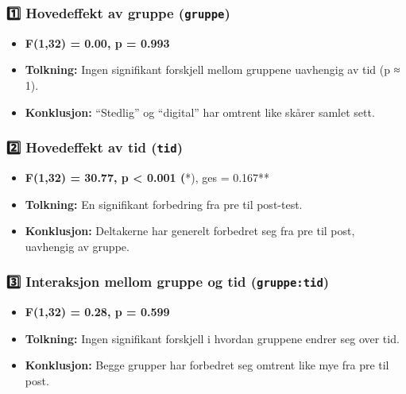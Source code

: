 \documentclass[
  letterpaper,
  DIV=11,
  numbers=noendperiod]{scrreprt}
\providecommand{\tightlist}{%
  \setlength{\itemsep}{0pt}\setlength{\parskip}{0pt}}\usepackage{longtable,booktabs,array}
\begin{document}
\hypertarget{hovedeffekt-av-gruppe-gruppe}{%
\subsubsection{\texorpdfstring{1️⃣ \textbf{Hovedeffekt av gruppe
(\texttt{gruppe})}}{1️⃣ Hovedeffekt av gruppe (gruppe)}}\label{hovedeffekt-av-gruppe-gruppe}}

\begin{itemize}
\tightlist
\item
  \textbf{F(1,32) = 0.00, p = 0.993}\\
\item
  \textbf{Tolkning:} Ingen signifikant forskjell mellom gruppene
  uavhengig av tid (p ≈ 1).\\
\item
  \textbf{Konklusjon:} ``Stedlig'' og ``digital'' har omtrent like
  skårer samlet sett.
\end{itemize}

\hypertarget{hovedeffekt-av-tid-tid}{%
\subsubsection{\texorpdfstring{2️⃣ \textbf{Hovedeffekt av tid
(\texttt{tid})}}{2️⃣ Hovedeffekt av tid (tid)}}\label{hovedeffekt-av-tid-tid}}

\begin{itemize}
\tightlist
\item
  \textbf{F(1,32) = 30.77, p \textless{} 0.001 (}*), ges = 0.167**\\
\item
  \textbf{Tolkning:} En signifikant forbedring fra pre til post-test.\\
\item
  \textbf{Konklusjon:} Deltakerne har generelt forbedret seg fra pre til
  post, uavhengig av gruppe.
\end{itemize}

\hypertarget{interaksjon-mellom-gruppe-og-tid-gruppetid}{%
\subsubsection{\texorpdfstring{3️⃣ \textbf{Interaksjon mellom gruppe og
tid
(\texttt{gruppe:tid})}}{3️⃣ Interaksjon mellom gruppe og tid (gruppe:tid)}}\label{interaksjon-mellom-gruppe-og-tid-gruppetid}}

\begin{itemize}
\tightlist
\item
  \textbf{F(1,32) = 0.28, p = 0.599}\\
\item
  \textbf{Tolkning:} Ingen signifikant forskjell i hvordan gruppene
  endrer seg over tid.\\
\item
  \textbf{Konklusjon:} Begge grupper har forbedret seg omtrent like mye
  fra pre til post.
\end{itemize}
\end{document}
